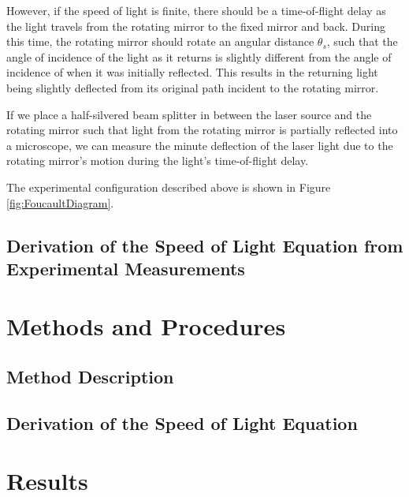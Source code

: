 \documentclass[twocolumn]{article}
\begin{document}
		However, if the speed of light is finite, there should be a time-of-flight delay as the light travels from the rotating mirror to the fixed mirror and back.
		During this time, the rotating mirror should rotate an angular distance $\theta_s$, such that the angle of incidence of the light as it returns is slightly different from the angle of incidence of when it was initially reflected.
		This results in the returning light being slightly deflected from its original path incident to the rotating mirror.
		
		If we place a half-silvered beam splitter in between the laser source and the rotating mirror such that light from the rotating mirror is partially reflected into a microscope, we can measure the minute deflection of the laser light due to the rotating mirror's motion during the light's time-of-flight delay.
		
		The experimental configuration described above is shown in Figure \ref{fig:FoucaultDiagram}.
		
		\subsection{Derivation of the Speed of Light Equation from Experimental Measurements}
		
\section{Methods and Procedures}
	\label{sec:Methods}
	\subsection{Method Description}
	\subsection{Derivation of the Speed of Light Equation}

\section{Results}
	\label{sec:Results}
\end{document}
